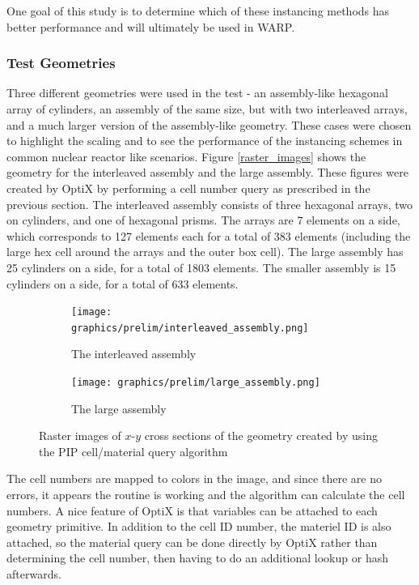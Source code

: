 One goal of this study is to determine which of these instancing methods has better performance and will ultimately be used in WARP.

\subsubsection{Test Geometries}

Three different geometries were used in the test - an assembly-like hexagonal array of cylinders, an assembly of the same size, but with two interleaved arrays, and a much larger version of the assembly-like geometry. These cases were chosen to highlight the scaling and to see the performance of the instancing schemes in common nuclear reactor like scenarios.  Figure \ref{raster_images} shows the 	geometry for the interleaved assembly and the large assembly.  These figures were created by OptiX by performing a cell number query as prescribed in the previous section.  The interleaved assembly consists of three hexagonal arrays, two on cylinders, and one of hexagonal prisms.  The arrays are 7 elements on a side, which corresponds to 127 elements each for a total of 383 elements (including the large hex cell around the arrays and the outer box cell).  The large assembly has 25 cylinders on a side, for a total of 1803 elements.  The smaller assembly is 15 cylinders on a side, for a total of 633 elements.

\begin{figure}[h!]
\centering
\begin{subfigure}{.5\textwidth}
  \centering
  \texttt{[image: graphics/prelim/interleaved\_assembly.png]}
  \caption{The interleaved assembly}
  \label{fig:sub1}
\end{subfigure}%
\begin{subfigure}{.5\textwidth}
  \centering
  \texttt{[image: graphics/prelim/large\_assembly.png]}
  \caption{The large assembly}
  \label{fig:sub2}
\end{subfigure}
\caption{Raster images of $x$-$y$ cross sections of the geometry created by using the PIP cell/material query algorithm \label{raster_images}}
\label{fig:test}
\end{figure}

The cell numbers are mapped to colors in the image, and since there are no errors, it appears the routine is working and the algorithm can calculate the cell numbers.  A nice feature of OptiX is that variables can be attached to each geometry primitive.  In addition to the cell ID number, the materiel ID is also attached, so the material query can be done directly by OptiX rather than determining the cell number, then having to do an additional lookup or hash afterwards.

